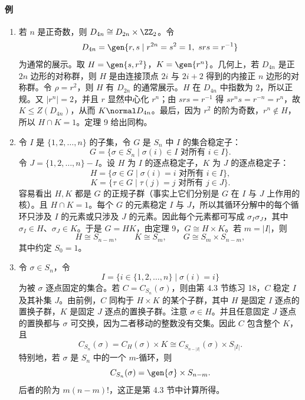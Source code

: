 \paragraph{例}
\begin{enumerate}[label=(\arabic*)]
  \item 若 $n$ 是正奇数，则 $D_{4n}\cong D_{2n}\times\ZZ_2$。令
  \[
    D_{4n}=\gen{r,s\mid r^{2n}=s^2=1,
\ srs=r^{-1}}
  \]
  为通常的展示。取 $H=\gen{s,r^2}$，$K=\gen{r^n}$。几何上，若 $D_{4n}$ 是正 $2n$ 边形的对称群，则 $H$ 是由连接顶点 $2i$ 与 $2i+2$ 得到的内接正 $n$ 边形的对称群。令 $\rho=r^2$，则 $H$ 有 $D_{2n}$ 的通常展示。$H$ 在 $D_{4n}$ 中指数为 $2$，所以正规。又 $|r^n|=2$，并且 $r$ 显然中心化 $r^n$；由 $srs=r^{-1}$ 得 $sr^ns=r^{-n}=r^n$，故 $K\leq Z(D_{4n})$，从而 $K\normal D_{4n}$。最后，因为 $r^2$ 的阶为奇数，$r^n\notin H$，所以 $H\cap K=1$。定理 9 给出同构。

  \item 令 $I$ 是 $\{1,2,
\ldots,n\}$ 的子集，令 $G$ 是 $S_n$ 中 $I$ 的集合稳定子：
  \[
    G=\{\sigma\in S_n\mid \sigma(i)\in I\text{ 对所有 }i\in I\}.
  \]
  令 $J=\{1,2,
\ldots,n\}-I$。设 $H$ 为 $I$ 的逐点稳定子，$K$ 为 $J$ 的逐点稳定子：
  \[
    H=\{\sigma\in G\mid \sigma(i)=i\text{ 对所有 }i\in I\},
  \]
  \[
    K=\{\tau\in G\mid \tau(j)=j\text{ 对所有 }j\in J\}.
  \]
  容易看出 $H,K$ 都是 $G$ 的正规子群（事实上它们分别是 $G$ 在 $I$ 与 $J$ 上作用的核）。且 $H\cap K=1$。每个 $G$ 的元素稳定 $I$ 与 $J$，所以其循环分解中的每个循环只涉及 $I$ 的元素或只涉及 $J$ 的元素。因此每个元素都可写成 $\sigma_I\sigma_J$，其中 $\sigma_I\in H$、$\sigma_J\in K$。于是 $G=HK$，由定理 9，$G\cong H\times K$。若 $m=|I|$，则
  \[
    H\cong S_{n-m},
\qquad K\cong S_m,
\qquad G\cong S_m\times S_{n-m},
  \]
  其中约定 $S_0=1$。

  \item 令 $\sigma\in S_n$，令
  \[
    I=\{i\in\{1,2,
\ldots,n\}\mid \sigma(i)=i\}
  \]
  为被 $\sigma$ 逐点固定的集合。若 $C=C_{S_n}(\sigma)$，则由第 4.3 节练习 18，$C$ 稳定 $I$ 及其补集 $J$。由前例，$C$ 同构于 $H\times K$ 的某个子群，其中 $H$ 是固定 $I$ 逐点的置换子群，$K$ 是固定 $J$ 逐点的置换子群。注意 $\sigma\in H$。并且任意固定 $J$ 逐点的置换都与 $\sigma$ 可交换，因为二者移动的整数没有交集。因此 $C$ 包含整个 $K$，且
  \[
    C_{S_n}(\sigma)=C_H(\sigma)\times K\cong C_{S_{n-|I|}}(\sigma)\times S_{|I|}.
  \]
  特别地，若 $\sigma$ 是 $S_n$ 中的一个 $m$-循环，则
  \[
    C_{S_n}(\sigma)=\gen{\sigma}\times S_{n-m}.
  \]
  后者的阶为 $m(n-m)!$，这正是第 4.3 节中计算所得。
\end{enumerate}

